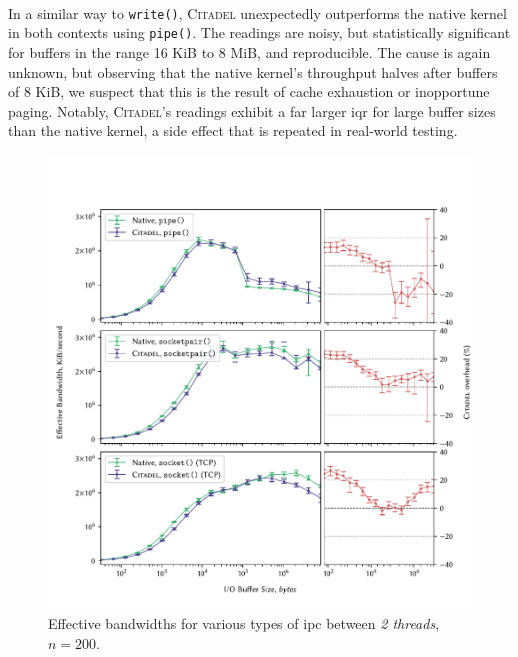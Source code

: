 \paragraph{} In a similar way to \texttt{write()}, \textsc{Citadel} unexpectedly outperforms the native kernel in both contexts using \texttt{pipe()}. The readings are noisy, but statistically significant for buffers in the range 16 KiB to 8 MiB, and reproducible. The cause is again unknown, but observing that the native kernel's throughput halves after buffers of 8 KiB, we suspect that this is the result of cache exhaustion or inopportune paging. Notably, \textsc{Citadel}'s readings exhibit a far larger \acrshort{iqr} for large buffer sizes than the native kernel, a side effect that is repeated in real-world testing.

\begin{figure}[]
    \centering
    \includegraphics[width=\linewidth]{figures/graphs/ipc-2thread.pdf}
    \vspace{-5mm}
    \caption[Effective bandwidths for various types of IPC between \textit{2 threads}.]{Effective bandwidths for various types of \acrshort{ipc} between \textit{2 threads}, $n=200$.}
    \label{fig:ipc-2thread-graph}
\end{figure}


